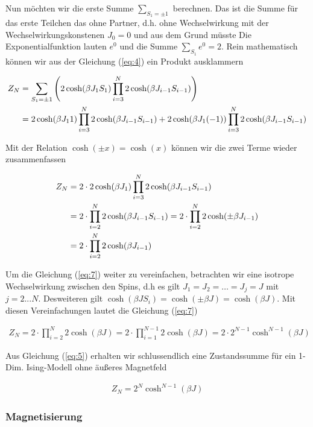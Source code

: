 Nun möchten wir die erste Summe \(\sum_{S_1=\pm 1}\) berechnen. Das ist die Summe für das erste Teilchen das ohne Partner, d.h. ohne Wechselwirkung mit der Wechselwirkungskonstenen \(J_0=0\) und aus dem Grund müsste Die Exponentialfunktion lauten \(e^0\) und die Summe \(\sum_{S_1}e^0 = 2\). Rein mathematisch können wir aus der Gleichung (\ref{eq:4}) ein Produkt ausklammern

\begin{align}
  \label{eq:6}
   Z_N &=\sum_{S_1=\pm 1}\left( 2\cosh(\beta J_1 S_1) \prod_{i=3}^N2\cosh( \beta J_{i-1}S_{i-1}) \right) \notag\\
&=2\cosh(\beta J_1 1)\prod_{i=3}^N2\cosh( \beta J_{i-1}S_{i-1}) + 2\cosh(\beta J_1 (-1))\prod_{i=3}^N2\cosh( \beta J_{i-1}S_{i-1})
\end{align}

Mit der Relation  \(\cosh(\pm x) = \cosh(x) \) können wir die zwei Terme wieder zusammenfassen

\begin{align}
  \label{eq:7}
   Z_N &=2\cdot  2\cosh(\beta J_1)\prod_{i=3}^N2\cosh( \beta J_{i-1}S_{i-1})  \notag\\
&=2\cdot\prod_{i=2}^N2\cosh( \beta J_{i-1}S_{i-1}) = 2\cdot\prod_{i=2}^N2\cosh(\pm \beta J_{i-1}) \notag\\
&=  2\cdot\prod_{i=2}^N2\cosh(\beta J_{i-1})
\end{align}

Um die Gleichung (\ref{eq:7}) weiter zu vereinfachen, betrachten wir eine isotrope Wechselwirkung zwischen den Spins, d.h es gilt \(J_1=J_2=\dots=J_j=J\) mit \(j=2...N\). Desweiteren gilt \(\cosh(\beta J S_i ) = \cosh(\pm \beta J) =  \cosh(\beta J) \). Mit diesen Vereinfachungen lautet die Gleichung (\ref{eq:7})

\begin{align}
  \label{eq:5}
   Z_N =2\cdot \prod_{i=2}^N2\cosh( \beta J ) = 2\cdot \prod_{i=1}^{N-1}2\cosh( \beta J ) = 2\cdot 2^{N-1}\cosh^{N-1}( \beta J ) 
\end{align}

Aus Gleichung (\ref{eq:5}) erhalten wir schlussendlich eine Zustandssumme für ein 1-Dim. Ising-Modell ohne äußeres Magnetfeld

\begin{align}
  \label{eq:8}
  \boxed{Z_N = 2^{N}\cosh^{N-1}( \beta J )  }
\end{align}

\subsubsection*{Magnetisierung}

